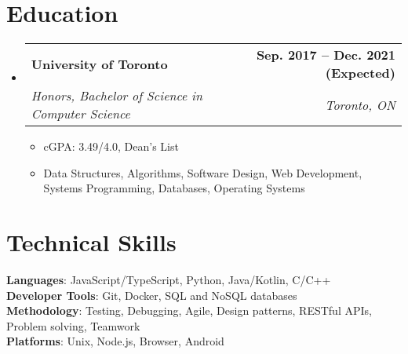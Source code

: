\documentclass[letterpaper,11pt]{article}
\makeatletter
\newcommand{\resumeItem}[1]{
  \item\small{
    {#1 \vspace{-2pt}}
  }
}
\newcommand{\resumeSubheading}[4]{
  \vspace{-2pt}\item
    \begin{tabular*}{1.0\textwidth}[t]{l@{\extracolsep{\fill}}r}
      \textbf{#1} & \textbf{\small #2} \\
      \textit{\small#3} & \textit{\small #4} \\
    \end{tabular*}\vspace{-7pt}
}
\newcommand{\resumeSubHeadingListStart}{\begin{itemize}[leftmargin=0.0in, label={}]}
\newcommand{\resumeSubHeadingListEnd}{\end{itemize}}
\newcommand{\resumeItemListStart}{\begin{itemize}}
\newcommand{\resumeItemListEnd}{\end{itemize}\vspace{-5pt}}
\makeatother
\begin{document}
\section{Education}
  \resumeSubHeadingListStart
    \resumeSubheading
      {University of Toronto}{Sep. 2017 -- Dec. 2021 (Expected)}
      {Honors, Bachelor of Science in Computer Science}{Toronto, ON}
      \resumeItemListStart
      \resumeItem{cGPA: 3.49/4.0, Dean's List}
      \resumeItem{Data Structures, Algorithms, Software Design, Web Development, Systems Programming, Databases, Operating Systems}
      \resumeItemListEnd
  \resumeSubHeadingListEnd

\section{Technical Skills}
 \begin{itemize}[leftmargin=0.15in, label={}]
    \small{\item{
     \textbf{Languages}{: JavaScript/TypeScript, Python, Java/Kotlin, C/C++} \\
     \textbf{Developer Tools}{: Git, Docker, SQL and NoSQL databases} \\
     \textbf{Methodology}{: Testing, Debugging, Agile, Design patterns, RESTful APIs, Problem solving, Teamwork} \\
     \textbf{Platforms}{: Unix, Node.js, Browser, Android} \\
    }}
 \end{itemize}
 \vspace{-16pt}
\end{document}
